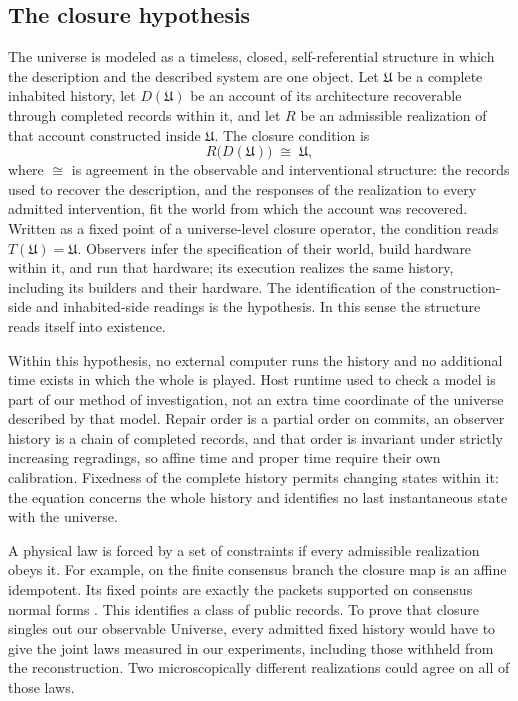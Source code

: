 \documentclass[11pt]{article}
\theoremstyle{definition}
\theoremstyle{remark}
\begin{document}
\subsection{The closure hypothesis}

The universe is modeled as a timeless, closed, self-referential structure in which the description and the described system are one object.
Let $\mathfrak U$ be a complete inhabited history, let $D(\mathfrak U)$ be an
account of its architecture recoverable through completed records within it,
and let $R$ be an admissible realization of that account constructed inside
$\mathfrak U$. The closure condition is
\begin{equation}
R\bigl(D(\mathfrak U)\bigr)\;\cong\;\mathfrak U ,
\label{eq:closure-condition}
\end{equation}
where $\cong$ is agreement in the observable and interventional structure:
the records used to recover the description, and the responses of the
realization to every admitted intervention, fit the world from which the
account was recovered. Written as a fixed point of a
universe-level closure operator, the condition reads
$T(\mathfrak U)=\mathfrak U$. Observers infer the specification of their
world, build hardware within it, and run that hardware; its execution
realizes the same history, including its builders and their hardware. The
identification of the construction-side and inhabited-side readings is the
hypothesis. In this sense the structure reads itself into existence.

Within this hypothesis, no external computer runs the history and no
additional time exists in which the whole is played. Host runtime used to
check a model is part of our method of investigation, not an extra time
coordinate of the universe described by that model. Repair order is a partial order on commits, an observer
history is a chain of completed records, and that order is invariant under
strictly increasing regradings, so affine time and proper time require their
own calibration. Fixedness of the complete history permits changing states
within it: the equation concerns the whole history and identifies no last
instantaneous state with the universe.

A physical law is forced by a set of constraints if every admissible
realization obeys it. For example, on the finite
consensus branch the closure map is an affine idempotent. Its fixed
points are exactly the packets supported on consensus normal forms
\cite{ophconsensus}. This identifies a class of public records. To prove that closure
singles out our observable Universe, every admitted fixed history would
have to give the joint laws measured in our experiments, including those
withheld from the reconstruction. Two microscopically different
realizations could agree on all of those laws.
\end{document}
